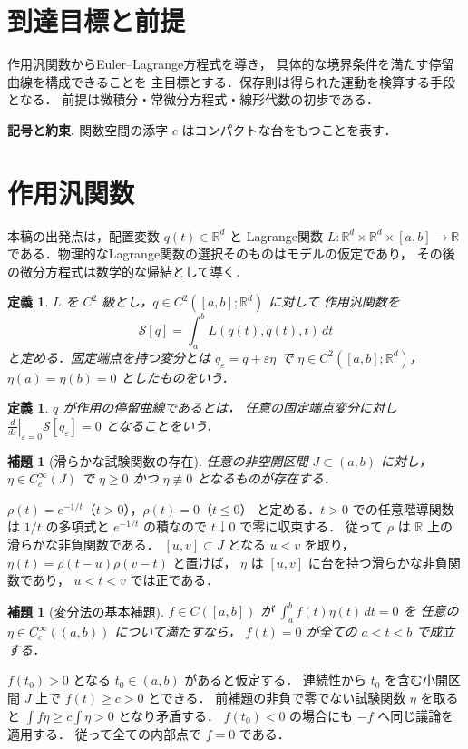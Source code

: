 \documentclass[a5paper,10pt,onecolumn]{jsarticle}
\makeatletter
\theoremstyle{mathnotetheorem}
\newtheorem{definition}[theorem]{定義}
\newtheorem{lemma}[theorem]{補題}
\renewcommand{\proofname}{証明}
\renewenvironment{proof}[1][\proofname]{%
  \par\pushQED{\qed}\normalfont\topsep4\p@\@plus2\p@\relax
  \trivlist\item[\hskip\labelsep\bfseries #1]\ignorespaces
}{\popQED\endtrivlist\@endpefalse}
\makeatother
\begin{document}
\section*{到達目標と前提}
作用汎関数からEuler--Lagrange方程式を導き，
具体的な境界条件を満たす停留曲線を構成できることを
主目標とする．保存則は得られた運動を検算する手段となる．
前提は微積分・常微分方程式・線形代数の初歩である．


\par\noindent\textbf{記号と約束.}\quad
関数空間の添字 $c$ はコンパクトな台をもつことを表す．
\par

\section{作用汎関数}
本稿の出発点は，配置変数 $q(t)\in\mathbb R^d$ と
Lagrange関数
$L:\mathbb R^d\times\mathbb R^d\times[a,b]\to\mathbb R$
である．物理的なLagrange関数の選択そのものはモデルの仮定であり，
その後の微分方程式は数学的な帰結として導く．
\begin{definition}
$L$ を $C^2$ 級とし，$q\in C^2([a,b];\mathbb R^d)$ に対して
作用汎関数を
\[
 \mathcal S[q]=\int_a^bL(q(t),\dot q(t),t)\,dt
\]
と定める．固定端点を持つ変分とは
$q_\varepsilon=q+\varepsilon\eta$ で
$\eta\in C^2([a,b];\mathbb R^d)$，
$\eta(a)=\eta(b)=0$ としたものをいう．
\end{definition}
\begin{definition}
$q$ が作用の停留曲線であるとは，
任意の固定端点変分に対し
$\left.\frac d{d\varepsilon}\right|_{\varepsilon=0}
 \mathcal S[q_\varepsilon]=0$ となることをいう．
\end{definition}
\begin{lemma}[滑らかな試験関数の存在]
任意の非空開区間 $J\subset(a,b)$ に対し，
$\eta\in C_c^\infty(J)$ で $\eta\ge0$ かつ
$\eta\not\equiv0$ となるものが存在する．
\end{lemma}
\begin{proof}
$\rho(t)=e^{-1/t}$（$t>0$），$\rho(t)=0$（$t\le0$）
と定める．$t>0$ での任意階導関数は
$1/t$ の多項式と $e^{-1/t}$ の積なので
$t\downarrow0$ で零に収束する．
従って $\rho$ は $\mathbb R$ 上の滑らかな非負関数である．
$[u,v]\subset J$ となる $u<v$ を取り，
$\eta(t)=\rho(t-u)\rho(v-t)$ と置けば，
$\eta$ は $[u,v]$ に台を持つ滑らかな非負関数であり，
$u<t<v$ では正である．
\end{proof}
\begin{lemma}[変分法の基本補題]\label{lem:fundamental}
$f\in C([a,b])$ が
$\int_a^bf(t)\eta(t)\,dt=0$ を
任意の $\eta\in C_c^\infty((a,b))$ について満たすなら，
$f(t)=0$ が全ての $a<t<b$ で成立する．
\end{lemma}
\begin{proof}
$f(t_0)>0$ となる $t_0\in(a,b)$ があると仮定する．
連続性から $t_0$ を含む小開区間 $J$ 上で
$f(t)\ge c>0$ とできる．
前補題の非負で零でない試験関数 $\eta$ を取ると
$\int f\eta\ge c\int\eta>0$ となり矛盾する．
$f(t_0)<0$ の場合にも $-f$ へ同じ議論を適用する．
従って全ての内部点で $f=0$ である．
\end{proof}
\end{document}
